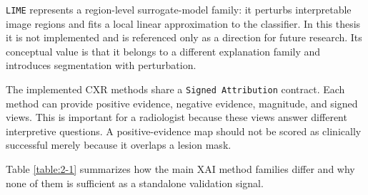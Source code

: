 \texttt{LIME} \cite{ref-lime} represents a region-level surrogate-model
family: it perturbs interpretable image regions and fits a local linear
approximation to the classifier. In this thesis it is not implemented
and is referenced only as a direction for future research.
Its conceptual value is that it belongs to a different
explanation family and introduces segmentation with perturbation.

The implemented CXR methods share a \texttt{Signed Attribution} contract.
Each method can provide positive evidence, negative evidence, magnitude,
and signed views. This is important for a radiologist because these views
answer different interpretive questions. A
positive-evidence map should not be scored as clinically successful
merely because it overlaps a lesion mask.

Table \ref{table:2-1} summarizes how the main XAI method families differ and why
none of them is sufficient as a standalone validation signal.

